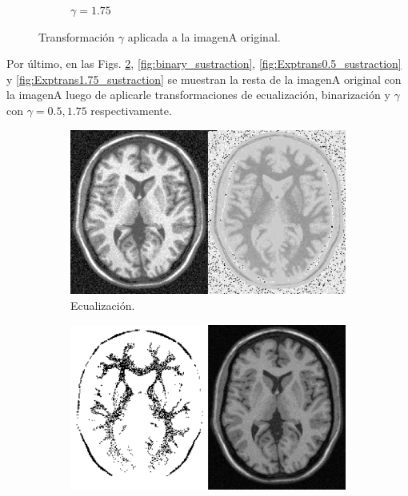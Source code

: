 \documentclass[letterpaper,12pt]{article}
\theoremstyle{plain}
\begin{document}
\begin{figure}[H]
\begin{subfigure}[h]{0.2\textwidth}
            \caption{$\gamma = 1.75$} 
         \end{subfigure}
    \caption{Transformación $\gamma$ aplicada a la imagenA original.}
    \label{fig:Exptrans}
\end{figure}

Por último, en las Figs. \ref{fig:EQ_sustraction}, \ref{fig:binary_sustraction}, \ref{fig:Exptrans0.5_sustraction} y \ref{fig:Exptrans1.75_sustraction} se muestran la resta de la imagenA original con la imagenA luego de aplicarle transformaciones de ecualización, binarización y $\gamma$ con $\gamma = 0.5,1.75$ respectivamente.

\begin{figure}[H]
    \centering
        \begin{subfigure}[h]{0.3\textwidth}
            \centering
            \includegraphics[width=\textwidth]{Figuras/dif_EQ.png}                
            \caption{Ecualización.}
            \label{fig:EQ_sustraction}
        \end{subfigure}
        \begin{subfigure}[h]{0.3\textwidth}
            \centering
            \includegraphics[width=\textwidth]{Figuras/dif_binary.png}

\end{subfigure}
\end{figure}
\end{document}
